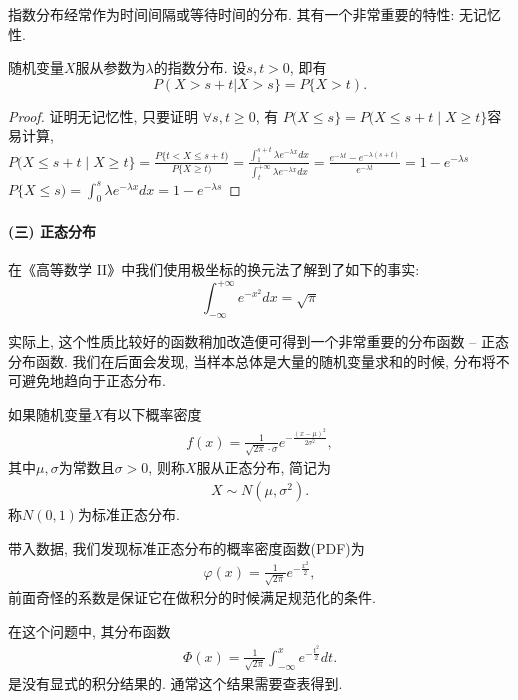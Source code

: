 指数分布经常作为时间间隔或等待时间的分布. 其有一个非常重要的特性: 无记忆性.

\begin{proposition}[指数分布的无记忆性]
    随机变量$X$服从参数为$\lambda$的指数分布. 设$s,t>0$, 即有
    \[ P(X>s+t|X>s\}=P\{X>t).\]
\end{proposition}

\begin{proof}
    证明无记忆性, 只要证明 $\forall s, t \geq 0$, 有 $P(X \leq s\}=P(X \leq s+t \mid X \geq t\}$容易计算, $P(X \leq s+t \mid X \geq t\}=\frac{P\{t<X \leq s+t)}{P\{X \geq t)}=\frac{\int_1^{s+t} \lambda e^{-\lambda x} d x}{\int_t^{+\infty} \lambda e^{-\lambda x} d x}=\frac{e^{-\lambda t}-e^{-\lambda(s+t)}}{e^{-\lambda t}}=1-e^{-\lambda s}$ $P\{X \leq s)=\int_0^s \lambda e^{-\lambda x} d x=1-e^{-\lambda s}$
\end{proof}

\paragraph{(三) 正态分布}

在《高等数学 II》中我们使用极坐标的换元法了解到了如下的事实:
$$
    \int_{-\infty}^{+\infty}e^{-x^2} dx =\sqrt \pi
$$

实际上, 这个性质比较好的函数稍加改造便可得到一个非常重要的分布函数 --
正态分布函数. 我们在后面会发现, 当样本总体是大量的随机变量求和的时候,
分布将不可避免地趋向于正态分布.

\begin{definition}
    如果随机变量$X$有以下概率密度
    \begin{align*}
        f(x)=\frac1{\sqrt{2\pi}\cdot\sigma}e^{-\frac{(x-\mu)^2}{2\sigma^2}},
    \end{align*}
    其中$\mu,\sigma$为常数且$\sigma>0$, 则称$X$服从正态分布, 简记为%
    \begin{align*}
        X \sim N(\mu,\sigma^2).
    \end{align*}
    称$N(0,1)$为标准正态分布.
\end{definition}

带入数据, 我们发现标准正态分布的概率密度函数(PDF)为
\begin{align*}
    \varphi(x)=\frac1{\sqrt{2\pi}}e^{-\frac{x^2}{2}},
\end{align*}
前面奇怪的系数是保证它在做积分的时候满足规范化的条件.

在这个问题中, 其分布函数
\begin{align*}
    \Phi(x)=\frac1{\sqrt{2\pi}}\int_{-\infty}^xe^{-\frac{t^2}{2}}dt.
\end{align*}
是没有显式的积分结果的. 通常这个结果需要查表得到.

